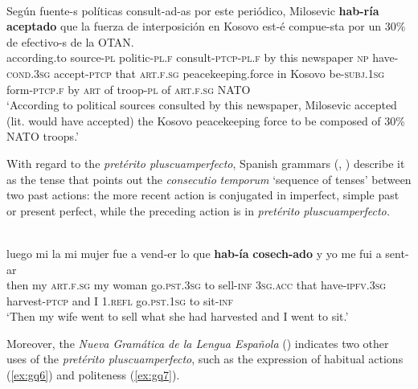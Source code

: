 \documentclass[output=paper]{langsci/langscibook}
\begin{document}
\ea \label{ex:gq4}
	\\
	\gll Según fuente-s políticas consult-ad-as por este periódico, Milosevic \textbf{hab-ría} \textbf{aceptado} que la {fuerza de interposición} en Kosovo est-é compue-sta por un {30\%} de efectivo-s de la OTAN.\\
	according.to source-\textsc{pl} politic-\textsc{pl.f} consult-\textsc{ptcp}-\textsc{pl.f} by this newspaper \textsc{np} have-\textsc{cond.3sg} accept-\textsc{ptcp} that \textsc{art.f.sg} {peacekeeping.force} in Kosovo be-\textsc{subj.1sg} form-\textsc{ptcp.f} by \textsc{art} { } of troop-\textsc{pl} of \textsc{art.f.sg} NATO \\
	\glt ‘According to political sources consulted by this newspaper, Milosevic accepted (lit. would have accepted) the Kosovo peacekeeping force to be composed of 30\% NATO troops.’
\z

With regard to the \textit{pretérito pluscuamperfecto}, Spanish grammars (\citealt{HernandezAlonso1986}, \citealt{Cartagena1999}) describe it as the tense that points out the \textit{consecutio} \textit{temporum} ‘sequence of tenses’ between two past actions: the more recent action is conjugated in imperfect, simple past or present perfect, while the preceding action is in \textit{pretérito} \textit{pluscuamperfecto.}


\ea  \label{ex:gq5}
	\\
	\gll luego mi la mi mujer fue a vend-er lo que \textbf{hab-ía} \textbf{cosech-ado} y yo me fui a sent-ar \\
	then my \textsc{art.f.sg} my woman go.\textsc{pst.3sg} to sell-\textsc{inf} \textsc{3sg.acc} that have-\textsc{ipfv.3sg} harvest-\textsc{ptcp} and I \textsc{1.refl} go.\textsc{pst.1sg} to sit-\textsc{inf}\\
	\glt ‘Then my wife went to sell what she had harvested and I went to sit.’
\z 

Moreover, the \textit{Nueva Gramática de la Lengua Española} (\citealt[542]{RealAcademia2010}) indicates two other uses of the \textit{pretérito pluscuamperfecto}, such as the expression of habitual actions (\ref{ex:gq6}) and politeness (\ref{ex:gq7}).
\end{document}
